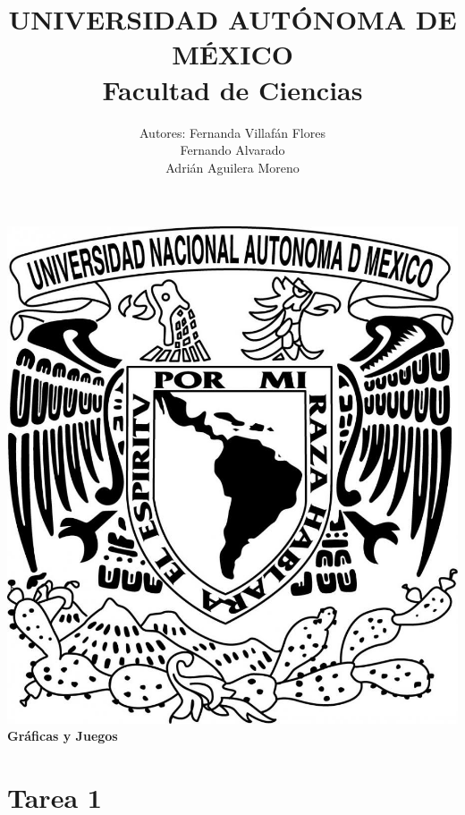 \documentclass{article}
\begin{document}
\title{UNIVERSIDAD AUTÓNOMA DE MÉXICO\\ Facultad de Ciencias}
\author{Autores:  Fernanda Villafán Flores
  \\ Fernando Alvarado
  \\ Adrián Aguilera Moreno}
\date{}
\maketitle
\begin{center}
  \includegraphics[scale=0.20]{./Imagen/Portada.jpg}\\[0.4cm]
  \Large
  \bf{Gráficas y Juegos}
  \normalsize
\end{center}
\newpage
{}
\section*{\LARGE{Tarea 1}}
\end{document}
